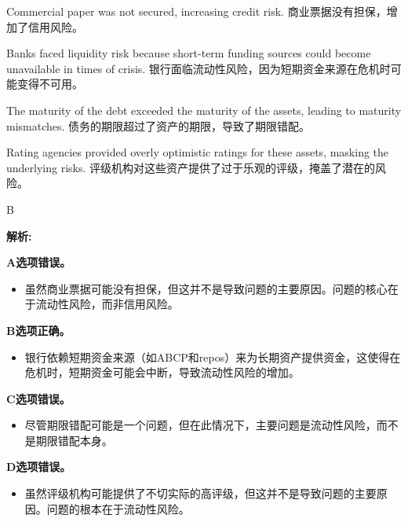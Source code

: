 \documentclass{article}
\newenvironment{explanation}
{\textbf{解析:}\par}
{\par}
\begin{document}
        \begin{choices}
            \item Commercial paper was not secured, increasing credit risk.  
            商业票据没有担保，增加了信用风险。
            \item Banks faced liquidity risk because short-term funding sources could become unavailable in times of crisis.  
            银行面临流动性风险，因为短期资金来源在危机时可能变得不可用。
            \item The maturity of the debt exceeded the maturity of the assets, leading to maturity mismatches.  
            债务的期限超过了资产的期限，导致了期限错配。
            \item Rating agencies provided overly optimistic ratings for these assets, masking the underlying risks.  
            评级机构对这些资产提供了过于乐观的评级，掩盖了潜在的风险。
        \end{choices}
        
        \begin{correctanswer}
        B
        \end{correctanswer}
        
        \begin{explanation}
            \textbf{A选项错误。}
            \begin{itemize}
                \item 虽然商业票据可能没有担保，但这并不是导致问题的主要原因。问题的核心在于流动性风险，而非信用风险。
            \end{itemize}
        
            \textbf{B选项正确。}
            \begin{itemize}
                \item 银行依赖短期资金来源（如ABCP和repos）来为长期资产提供资金，这使得在危机时，短期资金可能会中断，导致流动性风险的增加。
            \end{itemize}
        
            \textbf{C选项错误。}
            \begin{itemize}
                \item 尽管期限错配可能是一个问题，但在此情况下，主要问题是流动性风险，而不是期限错配本身。
            \end{itemize}
        
            \textbf{D选项错误。}
            \begin{itemize}
                \item 虽然评级机构可能提供了不切实际的高评级，但这并不是导致问题的主要原因。问题的根本在于流动性风险。
            \end{itemize}
        \end{explanation}
        
\end{document}
